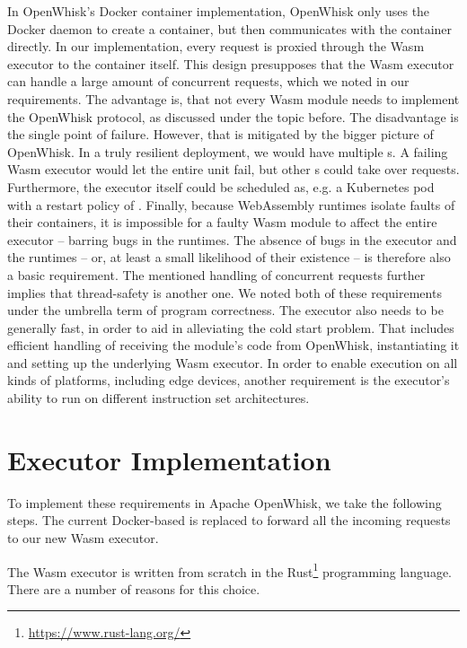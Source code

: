 In OpenWhisk's Docker container implementation, OpenWhisk only uses the Docker daemon to create a container, but then communicates with the container directly. In our implementation, every request is proxied through the Wasm executor to the container itself. This design presupposes that the Wasm executor can handle a large amount of concurrent requests, which we noted in our requirements. The advantage is, that not every Wasm module needs to implement the OpenWhisk protocol, as discussed under the  topic before. The disadvantage is the single point of failure. However, that is mitigated by the bigger picture of OpenWhisk. In a truly resilient deployment, we would have multiple s. A failing Wasm executor would let the entire  unit fail, but other s could take over requests. Furthermore, the executor itself could be scheduled as, e.g. a Kubernetes pod with a restart policy of . Finally, because WebAssembly runtimes isolate faults of their containers, it is impossible for a faulty Wasm module to affect the entire executor -- barring bugs in the runtimes. The absence of bugs in the executor and the runtimes -- or, at least a small likelihood of their existence -- is therefore also a basic requirement. The mentioned handling of concurrent requests further implies that thread-safety is another one. We noted both of these requirements under the umbrella term of program correctness.
The executor also needs to be generally fast, in order to aid in alleviating the cold start problem. That includes efficient handling of receiving the module's code from OpenWhisk, instantiating it and setting up the underlying Wasm executor. In order to enable execution on all kinds of platforms, including edge devices, another requirement is the executor's ability to run on different instruction set architectures.


\section{Executor Implementation}


To implement these requirements in Apache OpenWhisk, we take the following steps. The current Docker-based  is replaced to forward all the incoming requests to our new Wasm executor.

The Wasm executor is written from scratch in the Rust\footnote{\url{https://www.rust-lang.org/}} programming language. There are a number of reasons for this choice.

